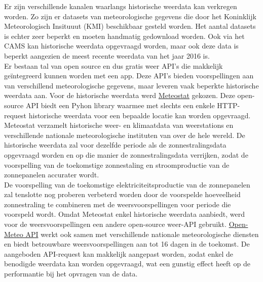 Er zijn verschillende kanalen waarlangs historische weerdata kan verkregen worden. Zo zijn er datasets van meteorologische gegevens die door het Koninklijk Meteorologisch Insituuut (KMI) beschikbaar gesteld worden. Het aantal datasets is echter zeer beperkt en moeten handmatig gedownload worden. Ook via het CAMS kan historische weerdata opgevraagd worden, maar ook deze data is beperkt aangezien de meest recente weerdata van het jaar 2016 is. \\

Er bestaan tal van open source en dus gratis weer API's die makkelijk geïntegreerd kunnen worden met een app. Deze API's bieden voorspellingen aan van verschillend meteorologische gegevens, maar leveren vaak beperkte historische weerdata aan. Voor de historische weerdata werd \href{https://dev.meteostat.net/}{Meteostat} gekozen. Deze open-source API biedt een Pyhon library waarmee met slechts een enkele HTTP-request historische weerdata voor een bepaalde locatie kan worden opgevraagd. Meteostat verzamelt historische weer- en klimaatdata van weerstations en verschillende nationale meteorologische instituten van over de hele wereld. De historische weerdata zal voor dezelfde periode als de zonnestralingsdata opgevraagd worden en op die manier de zonnestralingsdata verrijken, zodat de voorspelling van de toekomstige zonnestaling en stroomproductie van de zonnepanelen accurater wordt. \\

De voorspelling van de toekomstige elektriciteitsproductie van de zonnepanelen zal tenslotte nog proberen verbeterd worden door de voorspelde hoeveelheid zonnestraling te combineren met de weersvoorspellingen voor periode die voorspeld wordt. Omdat Meteostat enkel historische weerdata aanbiedt, werd voor de weersvoorspellingen een andere open-source weer-API gebruikt. \href{https://open-meteo.com/}{Open-Meteo API} werkt ook samen met verschillende nationale meteorologische diensten en biedt betrouwbare weersvoorspellingen aan tot 16 dagen in de toekomst. De aangeboden API-request kan makkelijk aangepast worden, zodat enkel de benodigde weerdata kan worden opgevraagd, wat een gunstig effect heeft op de performantie bij het opvragen van de data.
